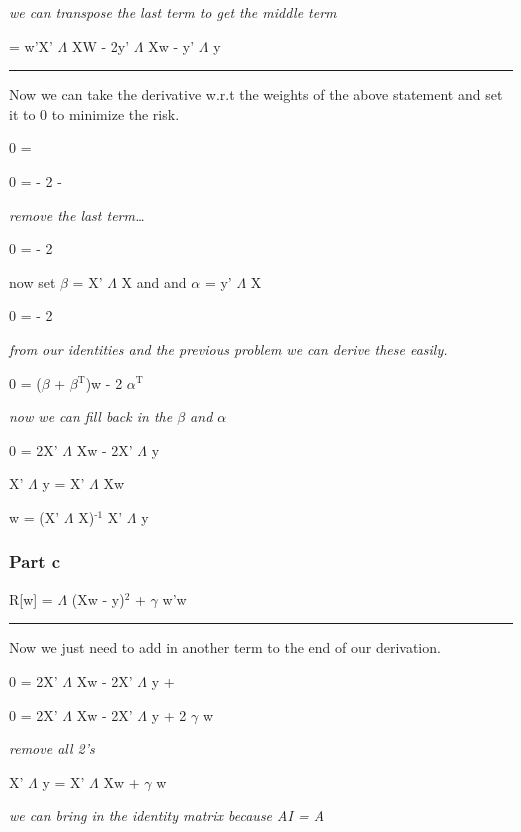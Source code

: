 \documentclass[11pt]{article}
\begin{document}
\emph{we can transpose the last term to get the middle term}

= w'X' $\Lambda$ XW - 2y' $\Lambda$ Xw - y' $\Lambda$ y

\rule{\linewidth}{0.5pt}
Now we can take the derivative w.r.t the weights of the above statement and set it to 0 to minimize the risk.

0 = 

0 =  - 2  - 

\emph{remove the last term\ldots{}}

0 =  - 2 

now set $\beta$ = X' $\Lambda$ X and and $\alpha$ = y' $\Lambda$ X

0 =  - 2 

\emph{from our identities and the previous problem we can derive these easily.}

0 = ($\beta$ + $\beta$$^{\text{T}}$)w  - 2 $\alpha$$^{\text{T}}$

\emph{now we can fill back in the $\beta$ and $\alpha$}

0 = 2X' $\Lambda$ Xw - 2X' $\Lambda$ y

X' $\Lambda$ y = X' $\Lambda$ Xw

w = (X' $\Lambda$ X)$^{\text{-1}}$ X' $\Lambda$ y

\subsubsection{Part c}
\label{sec-7-1-3}

R[w] = $\Lambda$ (Xw - y)$^{\text{2}}$ + $\gamma$ w'w

\rule{\linewidth}{0.5pt}

Now we just need to add in another term to the end of our derivation.

0 = 2X' $\Lambda$ Xw - 2X' $\Lambda$ y + 

0 = 2X' $\Lambda$ Xw - 2X' $\Lambda$ y + 2 $\gamma$ w

\emph{remove all 2's}

X' $\Lambda$ y = X' $\Lambda$ Xw + $\gamma$ w

\emph{we can bring in the identity matrix because AI = A}
\end{document}
